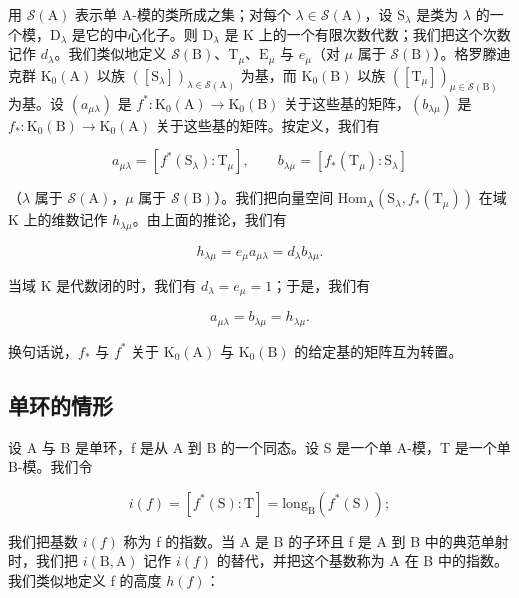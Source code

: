 用 \(\mathcal{S}(\mathrm{A})\) 表示单 A-模的类所成之集；对每个 \(\lambda \in \mathcal{S}(\mathrm{A})\)，设 \(\mathrm{S}_{\lambda}\) 是类为 \(\lambda\) 的一个模，\(\mathrm{D}_{\lambda}\) 是它的中心化子。则 \(\mathrm{D}_{\lambda}\) 是 \(\mathrm{K}\) 上的一个有限次数代数；我们把这个次数记作 \(d_{\lambda}\)。我们类似地定义 \(\mathcal{S}(\mathrm{B})\)、\(\mathrm{T}_{\mu}\)、\(\mathrm{E}_{\mu}\) 与 \(e_{\mu}\)（对 \(\mu\) 属于 \(\mathcal{S}(\mathrm{B})\)）。格罗滕迪克群 \(\mathrm{K}_0(\mathrm{A})\) 以族 \(([\mathrm{S}_{\lambda}])_{\lambda \in \mathcal{S}(\mathrm{A})}\) 为基，而 \(\mathrm{K}_0(\mathrm{B})\) 以族 \(([\mathrm{T}_{\mu}])_{\mu \in \mathcal{S}(\mathrm{B})}\) 为基。设 \((a_{\mu \lambda})\) 是 \(f^{*}: \mathrm{K}_{0}(\mathrm{A}) \to \mathrm{K}_{0}(\mathrm{B})\) 关于这些基的矩阵，\((b_{\lambda \mu})\) 是 \(f_{*}: \mathrm{K}_{0}(\mathrm{B}) \to \mathrm{K}_{0}(\mathrm{A})\) 关于这些基的矩阵。按定义，我们有

\[
a _ {\mu \lambda} = [ f ^ {*} (\mathrm{S} _ {\lambda}): \mathrm{T} _ {\mu} ], \qquad b _ {\lambda \mu} = [ f _ {*} (\mathrm{T} _ {\mu}): \mathrm{S} _ {\lambda} ]\tag{23}
\]

（\(\lambda\) 属于 \(\mathcal{S}(\mathrm{A})\)，\(\mu\) 属于 \(\mathcal{S}(\mathrm{B})\)）。我们把向量空间 \(\mathrm{Hom}_{\mathrm{A}}(\mathrm{S}_{\lambda}, f_{*}(\mathrm{T}_{\mu}))\) 在域 K 上的维数记作 \(h_{\lambda \mu}\)。由上面的推论，我们有

\[
h _ {\lambda \mu} = e _ {\mu} a _ {\mu \lambda} = d _ {\lambda} b _ {\lambda \mu}.\tag{24}
\]

当域 K 是代数闭的时，我们有 \(d_{\lambda} = e_{\mu} = 1\)；于是，我们有

\[
a _ {\mu \lambda} = b _ {\lambda \mu} = h _ {\lambda \mu}.\tag{25}
\]

换句话说，\(f_{*}\) 与 \(f^{*}\) 关于 \(\mathrm{K}_0(\mathrm{A})\) 与 \(\mathrm{K}_0(\mathrm{B})\) 的给定基的矩阵互为转置。

\subsection{单环的情形}

设 A 与 B 是单环，f 是从 A 到 B 的一个同态。设 S 是一个单 A-模，T 是一个单 B-模。我们令

\[
i (f) = [ f ^ {*} (\mathrm{S}): \mathrm{T} ] = \mathrm{long} _ {\mathrm{B}} (f ^ {*} (\mathrm{S}));\tag{26}
\]

我们把基数 \(i(f)\) 称为 f 的指数。当 A 是 B 的子环且 f 是 A 到 B 中的典范单射时，我们把 \(i(\mathrm{B},\mathrm{A})\) 记作 \(i(f)\) 的替代，并把这个基数称为 A 在 B 中的指数。我们类似地定义 f 的高度 \(h(f)\)：

